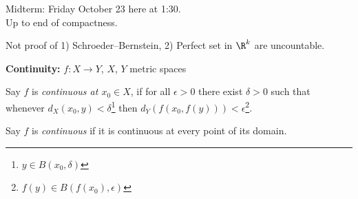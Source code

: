 Midterm: Friday October 23 here at 1:30. \\
Up to end of compactness.

Not proof of 1) Schroeder--Bernstein, 2) Perfect set in $\R^k$ are uncountable.

\textbf{Continuity:} $f\colon X\to Y$, $X$, $Y$ metric spaces

 Say $f$ is \emph{continuous at\/ $x_0\in X$}, if for all $\epsilon>0$ there exist $\delta>0$ such that whenever $d_X(x_0,y)<\delta$\footnote{$y\in B(x_0,\delta)$} then $d_Y(f(x_0,f(y)))<\epsilon$\footnote{$f(y)\in B(f(x_0),\epsilon)$}.

Say $f$ is \emph{continuous} if it is continuous at every point of its domain.

